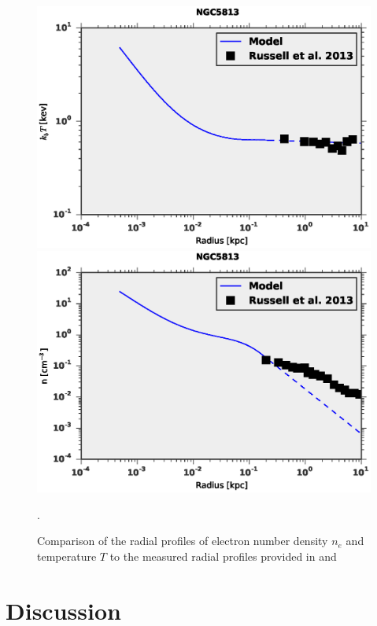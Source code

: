 \documentclass[usenatbib,fleqn]{mn2e}
\begin{document}
\begin{figure}
  \includegraphics[width=\columnwidth]{NGC5813_T.eps}
  \includegraphics[width=\columnwidth]{NGC5813_rho.eps}
  \caption{\label{fig:allen_compare} Comparison of the radial profiles of electron number density $n_e$ and temperature $T$ to
    the measured radial profiles provided in \citet{AllenDunn+:2006a} and \citet{ RussellMcNamara+:2013a}}.
\end{figure}


\section{Discussion}
\label{sec:discussion}
\end{document}
